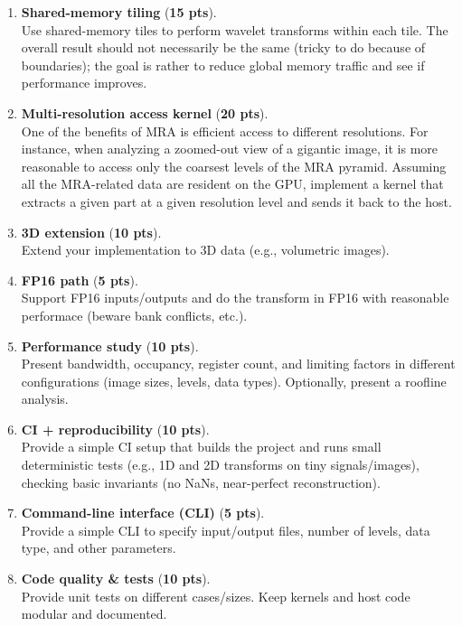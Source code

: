 \documentclass[11pt]{article}
\newcommand{\term}[1]{\textbf{#1}}
\begin{document}
\begin{enumerate}[leftmargin=1.5em]
  \item \term{Shared-memory tiling} (\textbf{15 pts}).\\
  Use shared-memory tiles to perform wavelet transforms within each tile.
  The overall result should not necessarily be the same (tricky to do because of boundaries); the goal is rather to reduce global memory traffic and see if performance improves.

  \item \term{Multi-resolution access kernel} (\textbf{20 pts}).\\
  One of the benefits of MRA is efficient access to different resolutions.
  For instance, when analyzing a zoomed-out view of a gigantic image, it is more reasonable to access only the coarsest levels of the MRA pyramid.
  Assuming all the MRA-related data are resident on the GPU, implement a kernel that extracts a given part at a given resolution level and sends it back to the host.

  \item \term{3D extension} (\textbf{10 pts}).\\
  Extend your implementation to 3D data (e.g., volumetric images).

  \item \term{FP16 path} (\textbf{5 pts}).\\
  Support FP16 inputs/outputs and do the transform in FP16 with reasonable performace (beware bank conflicts, etc.).

  \item \term{Performance study} (\textbf{10 pts}).\\
  Present bandwidth, occupancy, register count, and limiting factors in different configurations (image sizes, levels, data types).
  Optionally, present a roofline analysis.

  \item \term{CI + reproducibility} (\textbf{10 pts}).\\
  Provide a simple CI setup that builds the project and runs small deterministic tests (e.g., 1D and 2D transforms on tiny signals/images), checking basic invariants (no NaNs, near-perfect reconstruction).

  \item \term{Command-line interface (CLI)} (\textbf{5 pts}).\\
  Provide a simple CLI to specify input/output files, number of levels, data type, and other parameters.

  \item \term{Code quality \& tests} (\textbf{10 pts}).\\
  Provide unit tests on different cases/sizes.
  Keep kernels and host code modular and documented.

\end{enumerate}
\end{document}
